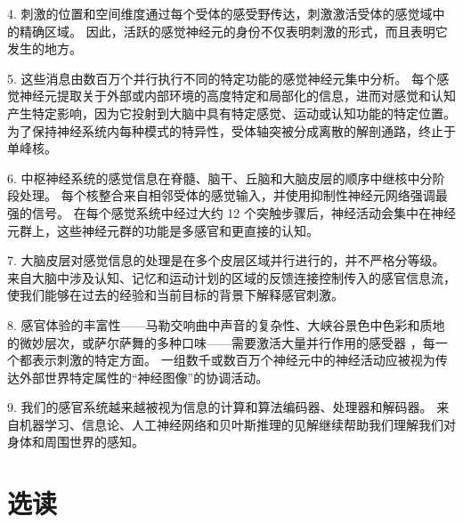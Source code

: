 4. 刺激的位置和空间维度通过每个受体的感受野传达，刺激激活受体的感觉域中的精确区域。 因此，活跃的感觉神经元的身份不仅表明刺激的形式，而且表明它发生的地方。 

5. 这些消息由数百万个并行执行不同的特定功能的感觉神经元集中分析。 每个感觉神经元提取关于外部或内部环境的高度特定和局部化的信息，进而对感觉和认知产生特定影响，因为它投射到大脑中具有特定感觉、运动或认知功能的特定位置。 为了保持神经系统内每种模式的特异性，受体轴突被分成离散的解剖通路，终止于单峰核。 

6. 中枢神经系统的感觉信息在脊髓、脑干、丘脑和大脑皮层的顺序中继核中分阶段处理。 每个核整合来自相邻受体的感觉输入，并使用抑制性神经元网络强调最强的信号。 在每个感觉系统中经过大约 12 个突触步骤后，神经活动会集中在神经元群上，这些神经元群的功能是多感官和更直接的认知。 

7. 大脑皮层对感觉信息的处理是在多个皮层区域并行进行的，并不严格分等级。 来自大脑中涉及认知、记忆和运动计划的区域的反馈连接控制传入的感官信息流，使我们能够在过去的经验和当前目标的背景下解释感官刺激。 

8. 感官体验的丰富性——马勒交响曲中声音的复杂性、大峡谷景色中色彩和质地的微妙层次，或萨尔萨舞的多种口味——需要激活大量并行作用的感受器 ，每一个都表示刺激的特定方面。 一组数千或数百万个神经元中的神经活动应被视为传达外部世界特定属性的“神经图像”的协调活动。 

9. 我们的感官系统越来越被视为信息的计算和算法编码器、处理器和解码器。 来自机器学习、信息论、人工神经网络和贝叶斯推理的见解继续帮助我们理解我们对身体和周围世界的感知。

\section{选读}
